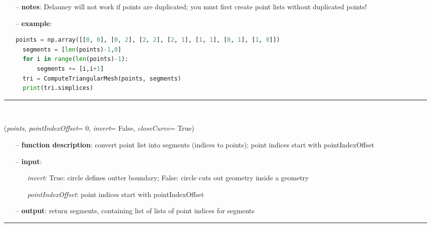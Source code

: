 \begin{itemize}[leftmargin=1.4cm]
\begin{itemize}[leftmargin=1.4cm]
\begin{itemize}[leftmargin=1.4cm]
\begin{itemize}[leftmargin=0.5cm]
\begin{itemize}[leftmargin=1.4cm]
\begin{itemize}[leftmargin=1.4cm]
\begin{itemize}[leftmargin=0.5cm]
\begin{itemize}[leftmargin=1.4cm]
\begin{itemize}[leftmargin=0.5cm]
\begin{itemize}[leftmargin=0.7cm]
\item[--]
{\bf notes}: Delauney will not work if points are duplicated; you must first create point lists without duplicated points!
\item[--]
{\bf example}: \vspace{-12pt}\ei\begin{lstlisting}[language=Python, xleftmargin=36pt]
  points = np.array([[0, 0], [0, 2], [2, 2], [2, 1], [1, 1], [0, 1], [1, 0]])
  segments = [len(points)-1,0]
  for i in range(len(points)-1):
      segments += [i,i+1]
  tri = ComputeTriangularMesh(points, segments)
  print(tri.simplices)
\end{lstlisting}\vspace{-24pt}\bi\item[]\vspace{-24pt}\vspace{12pt}\end{itemize}
%
\noindent\rule{8cm}{0.75pt}\vspace{1pt} \\ 
\begin{flushleft}
\label{sec:graphicsDataUtilities:SegmentsFromPoints}
({\it points}, {\it pointIndexOffset}= 0, {\it invert}= False, {\it closeCurve}= True)
\end{flushleft}
\setlength{\itemindent}{0.7cm}
\begin{itemize}[leftmargin=0.7cm]
\item[--]
{\bf function description}: convert point list into segments (indices to points); point indices start with pointIndexOffset
\item[--]
{\bf input}: \vspace{-6pt}
\begin{itemize}[leftmargin=1.2cm]
\setlength{\itemindent}{-0.7cm}
\item[]{\it invert}: True: circle defines outter boundary; False: circle cuts out geometry inside a geometry
\item[]{\it pointIndexOffset}: point indices start with pointIndexOffset
\end{itemize}
\item[--]
{\bf output}: return segments, containing list of lists of point indices for segments
\vspace{12pt}\end{itemize}
%
\noindent\rule{8cm}{0.75pt}\vspace{1pt} \\ 

\end{itemize}
\end{itemize}
\end{itemize}
\end{itemize}
\end{itemize}
\end{itemize}
\end{itemize}
\end{itemize}
\end{itemize}
